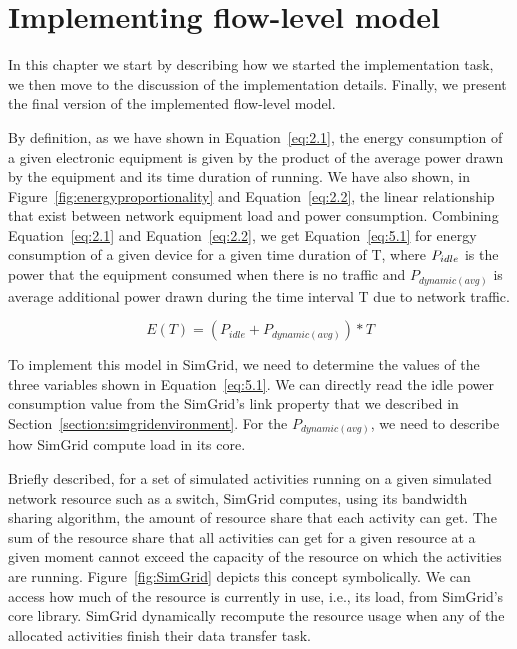 \chapter{Implementing flow-level model}
\label{chapter:implementation}

In this chapter we start by describing how we started the implementation task, we then move to the discussion of the implementation details. Finally, we present the final version of the implemented flow-level model. 

By definition, as we have shown in Equation~\ref{eq:2.1}, the energy consumption of a given electronic equipment is given by the product of the average power drawn by the equipment and its time duration of running. We have also shown, in Figure~\ref{fig:energyproportionality} and Equation~\ref{eq:2.2}, the linear relationship that exist between network equipment load and power consumption. Combining Equation~\ref{eq:2.1} and Equation~\ref{eq:2.2}, we get  Equation~\ref{eq:5.1} for energy consumption of a given device for a given time duration of T, where \($$P_{idle}$$\) is the power that the equipment consumed when there is no traffic and \(P_{dynamic (avg)}\) is average additional power drawn during the time interval T due to network traffic.

\begin{equation} \label{eq:5.1}
E(T) = (P_{idle} + P_{dynamic (avg)}) * T 
\end{equation} 

To implement this model in SimGrid, we need to determine the values of the three variables shown in Equation~\ref{eq:5.1}. We can directly read the idle power consumption value from the SimGrid's link property that we described in Section~\ref{section:simgridenvironment}. For the \(P_{dynamic (avg)}\), we need to describe how SimGrid compute load in its core. 

Briefly described, for a set of simulated activities running on a given simulated network resource such as a switch, SimGrid computes, using its bandwidth sharing algorithm, the amount of resource share that each activity can get. The sum of the resource share that all activities can get for a given resource at a given moment cannot exceed the capacity of the resource on which the activities are running. Figure~\ref{fig:SimGrid} depicts this concept symbolically. We can access how much of the resource is currently in use, i.e., its load, from SimGrid's core library. SimGrid dynamically recompute the resource usage when any of the allocated activities finish their data transfer task. 

